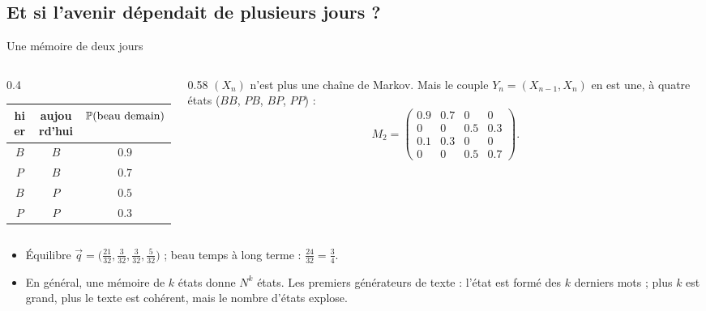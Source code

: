 \subsection{Et si l'avenir dépendait de plusieurs jours ?}

\begin{frame}{Une mémoire de deux jours}
  \begin{columns}[c]
    \begin{column}{0.4\textwidth}
      \begin{center}
      \small
      \begin{tabular}{ccc}
        \toprule
        hier & aujourd'hui & $\P{\text{beau demain}}$ \\
        \midrule
        $B$ & $B$ & $\num{0.9}$ \\
        $P$ & $B$ & $\num{0.7}$ \\
        $B$ & $P$ & $\num{0.5}$ \\
        $P$ & $P$ & $\num{0.3}$ \\
        \bottomrule
      \end{tabular}
      \end{center}
    \end{column}
    \begin{column}{0.58\textwidth}
      \small $(X_n)$ n'est plus une chaîne de Markov. Mais le couple
      $Y_n=(X_{n-1},X_n)$ en est une, à quatre états ($BB$, $PB$, $BP$,
      $PP$) :
      \[
        M_2 = \begin{pmatrix}
          \num{0.9} & \num{0.7} & 0 & 0\\
          0 & 0 & \num{0.5} & \num{0.3}\\
          \num{0.1} & \num{0.3} & 0 & 0\\
          0 & 0 & \num{0.5} & \num{0.7}
        \end{pmatrix}.
      \]
    \end{column}
  \end{columns}
  \small
  \begin{itemize}
    \item Équilibre
      $\vec q=\big(\tfrac{21}{32},\tfrac3{32},\tfrac3{32},\tfrac5{32}\big)$ ;
      beau temps à long terme : $\tfrac{24}{32}=\tfrac34$.
    \item En général, une mémoire de $k$ états donne $N^k$ états. Les
      premiers générateurs de texte : l'état est formé des $k$ derniers
      mots ; plus $k$ est grand, plus le texte est cohérent, mais le
      nombre d'états explose.
  \end{itemize}
\end{frame}

